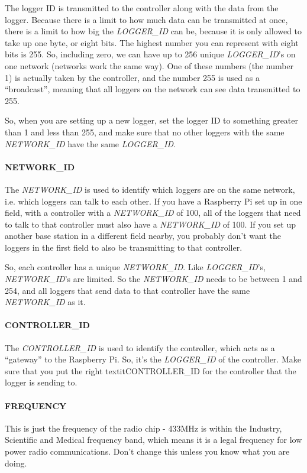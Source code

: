 \documentclass[10pt]{article}
\begin{document}
The logger ID is transmitted to the controller along with the data from the logger. Because there is a limit to how much data can be transmitted at once, there is a limit
to how big the \textit{LOGGER\_ID} can be, because it is only allowed to take up one byte, or eight bits. The highest number you can represent with eight bits is 255. So,
including zero, we can have up to 256 unique \textit{LOGGER\_ID}'s on one network (networks work the same way). One of these numbers (the number 1) is actually taken by
the controller, and the number 255 is used as a ``broadcast'', meaning that all loggers on the network can see data transmitted to 255.

So, when you are setting up a new logger, set the logger ID to something greater than 1 and less than 255, and make sure that no other loggers with the same 
\textit{NETWORK\_ID} have the same \textit{LOGGER\_ID}. 

\paragraph{NETWORK\_ID}
The \textit{NETWORK\_ID} is used to identify which loggers are on the same network, i.e. which loggers can talk to each other. If you have a Raspberry Pi set up in one
field, with a controller with a \textit{NETWORK\_ID} of 100, all of the loggers that need to talk to that controller must also have a \textit{NETWORK\_ID} of 100. If you 
set up another base station in a different field nearby, you probably don't want the loggers in the first field to also be transmitting to that controller.

So, each controller has a unique \textit{NETWORK\_ID}. Like \textit{LOGGER\_ID}'s, \textit{NETWORK\_ID}'s are limited. So the \textit{NETWORK\_ID} needs to be between 1 and 254, and all loggers that send data to that controller have the same \textit{NETWORK\_ID} as it.

\paragraph{CONTROLLER\_ID}
The \textit{CONTROLLER\_ID} is used to identify the controller, which acts as a ``gateway'' to the Raspberry Pi. So, it's the \textit{LOGGER\_ID} of the controller. Make
sure that you put the right textit{CONTROLLER\_ID} for the controller that the logger is sending to.

\paragraph{FREQUENCY}
This is just the frequency of the radio chip - 433MHz is within the Industry, Scientific and Medical frequency band, which means it is a legal frequency for low power
radio communications. Don't change this unless you know what you are doing.
\end{document}
